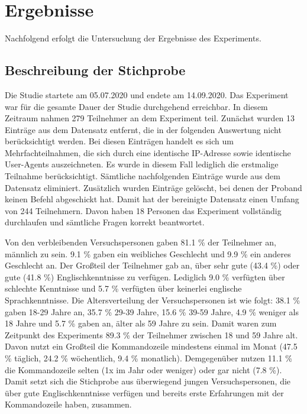 \section{Ergebnisse}
Nachfolgend erfolgt die Untersuchung der Ergebnisse des Experiments.

\subsection{Beschreibung der Stichprobe}\label{beschreibung}
Die Studie startete am 05.07.2020 und endete am 14.09.2020. Das Experiment war für die gesamte Dauer der Studie durchgehend erreichbar. In diesem Zeitraum nahmen 279 Teilnehmer an dem Experiment teil. Zunächst wurden 13 Einträge aus dem Datensatz entfernt, die in der folgenden Auswertung nicht berücksichtigt werden. Bei diesen Einträgen handelt es sich um Mehrfachteilnahmen, die sich durch eine identische IP-Adresse sowie identische User-Agents auszeichneten. Es wurde in diesem Fall lediglich die erstmalige Teilnahme berücksichtigt. Sämtliche nachfolgenden Einträge wurde aus dem Datensatz eliminiert. Zusätzlich wurden Einträge gelöscht, bei denen der Proband keinen Befehl abgeschickt hat. Damit hat der bereinigte Datensatz einen Umfang von 244 Teilnehmern. Davon haben 18 Personen das Experiment vollständig durchlaufen und sämtliche Fragen korrekt beantwortet.

Von den verbleibenden Versuchspersonen gaben 81.1 \% der Teilnehmer an, männlich zu sein. 9.1 \% gaben ein weibliches Geschlecht und 9.9 \% ein anderes Geschlecht an. Der Großteil der Teilnehmer gab an, über sehr gute (43.4 \%) oder gute (41.8 \%) Englischkenntnisse zu verfügen. Lediglich 9.0 \% verfügten über schlechte Kenntnisse und 5.7 \% verfügten über keinerlei englische Sprachkenntnisse. Die Altersverteilung der Versuchspersonen ist wie folgt: 38.1 \% gaben 18-29 Jahre an, 35.7 \%  29-39 Jahre,  15.6 \% 39-59 Jahre, 4.9 \% weniger als 18 Jahre und 5.7 \% gaben an, älter als 59 Jahre zu sein. Damit waren zum Zeitpunkt des Experiments 89.3 \% der Teilnehmer zwischen 18 und 59 Jahre alt. Davon nutzt ein Großteil die Kommandozeile mindestens einmal im Monat (47.5 \% täglich, 24.2 \% wöchentlich, 9.4 \% monatlich). Demgegenüber nutzen 11.1 \% die Kommandozeile selten (1x im Jahr oder weniger) oder gar nicht (7.8 \%). Damit setzt sich die Stichprobe aus überwiegend jungen Versuchspersonen, die über gute Englischkenntnisse verfügen und bereits erste Erfahrungen mit der Kommandozeile haben, zusammen.

